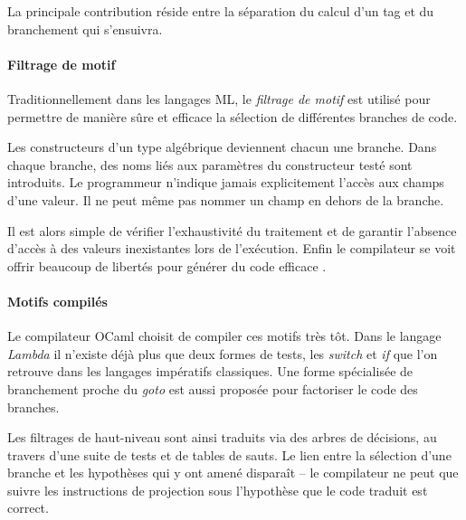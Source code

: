 La principale contribution réside entre la séparation du calcul d'un tag et du
branchement qui s'ensuivra.

\paragraph{Filtrage de motif} Traditionnellement dans les langages ML, le
\emph{filtrage de motif} est utilisé pour permettre de manière sûre et efficace
la sélection de différentes branches de code.

Les constructeurs d'un type algébrique deviennent chacun une branche. Dans
chaque branche, des noms liés aux paramètres du constructeur testé sont
introduits. Le programmeur n'indique jamais explicitement l'accès aux champs
d'une valeur. Il ne peut même pas nommer un champ en dehors de la branche.

Il est alors simple de vérifier l'exhaustivité du traitement et de garantir
l'absence d'accès à des valeurs inexistantes lors de l'exécution. Enfin le
compilateur se voit offrir beaucoup de libertés pour générer du code efficace
.

\paragraph{Motifs compilés} Le compilateur OCaml choisit de compiler ces motifs
très tôt. Dans le langage \emph{Lambda} il n'existe déjà plus que deux formes
de tests, les \emph{switch} et \emph{if} que l'on retrouve dans les langages
impératifs classiques. Une forme spécialisée de branchement proche du
\emph{goto} est aussi proposée pour factoriser le code des branches.

Les filtrages de haut-niveau sont ainsi traduits via des arbres de décisions,
au travers d'une suite de tests et de tables de sauts.  Le lien entre la
sélection d'une branche et les hypothèses qui y ont amené disparaît -- le
compilateur ne peut que suivre les instructions de projection sous l'hypothèse
que le code traduit est correct.
